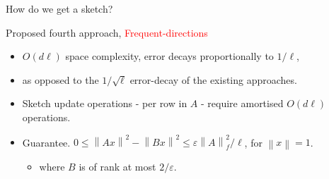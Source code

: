 \documentclass[first=dgreen,second=purple,logo=redque]{aaltoslides}
\newcommand{\vectornorm}[1]{\left\|#1\right\|}
\begin{document}
\begin{frame}[allowframebreaks=1]{How do we get a sketch?}
\begin{itemize}
\end{itemize}

\framebreak
Proposed fourth approach, \textcolor{red}{Frequent-directions}
\begin{itemize}
	\item $O(d\ell)$ space complexity, error decays proportionally to $1/\ell$,
	\item as opposed to the $1/\sqrt{\ell}$ error-decay of the existing approaches.
	\item Sketch update operations - per row in $A$ - require \textcolor{dgreen}{amortised} $O(d\ell)$ operations.
	\item \textcolor{dgreen}{Guarantee.} $0 \leq \vectornorm{Ax}^{2} - \vectornorm{Bx}^{2} \leq \varepsilon\vectornorm{A}_{f}^{2}/\ell$, for $\vectornorm{x} = 1$.
	\begin{itemize}\item where $B$ is of rank at most $2/\varepsilon$\cite{Ghashami14}.\end{itemize}
	
\end{itemize}
\end{frame}
\end{document}

